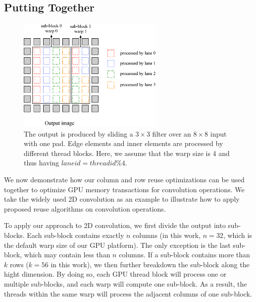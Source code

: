 \subsection{Putting Together\label{sec:together}}
\begin{figure}
	\centering
	\includegraphics[width=0.9\columnwidth,height=5.5cm]{./figure/overalldesign.eps} \caption{The output is produced by sliding a $3 \times
3$ filter over an $8 \times 8$ input with one pad. Edge elements and inner elements are processed by different thread blocks. Here, we assume
that the warp size is 4 and thus having $laneid=threadid\%4$.} \label{fig:overalldesign}
\end{figure}


We now demonstrate how our column and row reuse optimizations can be used together to optimize GPU memory transactions for convolution
operations. We take the widely used 2D convolution as an example to illustrate how to apply proposed reuse algorithms on convolution
operations.


To apply our approach to 2D convolution, we first divide the output into sub-blocks. Each sub-block contains exactly $n$ columns (in this
work, $n = 32$, which is the default warp size of our GPU platform). The only exception is the last sub-block, which may contain less than
$n$ columns. If a sub-block contains more than $k$ rows ($k=56$ in this work), we then further breakdown the sub-block along the hight
dimension. By doing so, each GPU thread block will process one or multiple sub-blocks, and each warp will compute one sub-block. As a
result, the threads within the same warp will process the adjacent columns of one sub-block.


